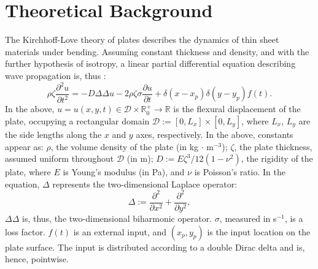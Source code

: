 \section{Theoretical Background}\label{sec:BackGround}
\noindent
The Kirchhoff-Love theory of plates describes the dynamics of thin sheet materials under bending. Assuming constant thickness and density, and with the further hypothesis of isotropy, a linear partial differential equation describing wave propagation is, thus \cite{graff1991wave,bilbao_numerical_2009}:
\begin{equation}\label{eq:KLCnt}
\rho \zeta \frac{\partial^2 u}{\partial t^2} = - D \Delta\Delta u - 2\rho\zeta\sigma\frac{\partial u}{\partial t} + \delta(x-x_p)\delta(y-y_p)f(t).
\end{equation}
In the above, $u = u(x,y,t) \in {\mathcal D} \times \mathbb{R}^+_0 \rightarrow \mathbb{R}$ is the flexural displacement of the plate, occupying a rectangular domain ${\mathcal D} := [0,L_x] \times [0,L_y]$, where $L_x$, $L_y$ are the side lengths along the $x$ and $y$ axes, respectively. In the above, constants appear as: $\rho$, the volume density of the plate (in kg $\cdot$ m$^{-3}$); $\zeta$, the plate thickness, assumed uniform throughout ${\mathcal D}$ (in m); $D := E\zeta^3 / 12 (1-\nu^2)$, the rigidity of the plate, where $E$ is Young's modulus (in Pa), and $\nu$ is Poisson's ratio. In the equation, $\Delta$ represents the two-dimensional Laplace operator:
\begin{equation}
\Delta := \frac{\partial^2}{\partial x^2} + \frac{\partial^2}{\partial y^2},
\end{equation}
$\Delta\Delta$ is, thus, the two-dimensional biharmonic operator. $\sigma$, measured in s$^{-1}$, is a loss factor. $f(t)$ is an external input, and $(x_p,y_p)$ is the input location on the plate surface. The input is distributed according to a double Dirac delta and is, hence, pointwise.


